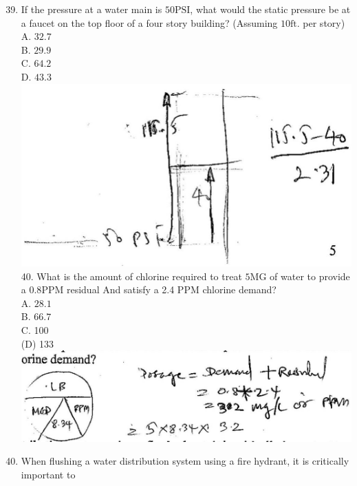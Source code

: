 \documentclass[10pt]{article}
\begin{document}
\begin{enumerate}
  \setcounter{enumi}{38}
  \item If the pressure at a water main is $50 \mathrm{PSI}$, what would the static pressure be at a faucet on the top floor of a four story building? (Assuming $10 \mathrm{ft}$. per story)\\
A. $32.7$\\
B. $29.9$\\
C. $64.2$\\
D. $43.3$\\

\includegraphics[max width=\textwidth]{2022_11_11_a5e8a54031fc138b833ag-5(5)}40. What is the amount of chlorine required to treat $5 \mathrm{MG}$ of water to provide a $0.8 \mathrm{PPM}$ residual And satisfy a 2.4 PPM chlorine demand?\\
A. $28.1$\\
B. $66.7$\\
C. 100\\
(D) 133\\

\includegraphics[max width=\textwidth]{2022_11_11_a5e8a54031fc138b833ag-6}

  \item When flushing a water distribution system using a fire hydrant, it is critically important to

\end{enumerate}
\end{document}
